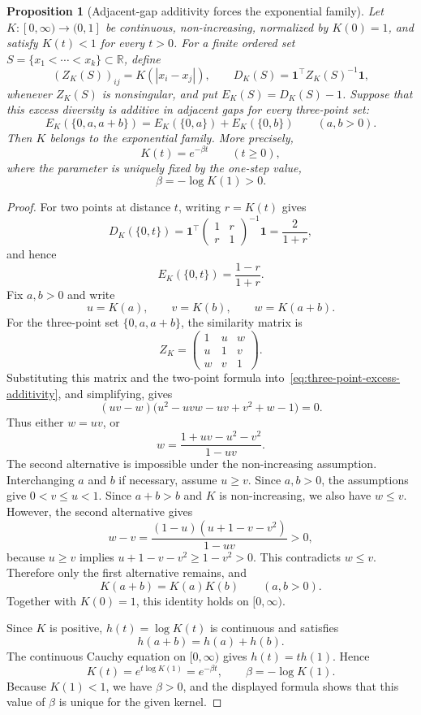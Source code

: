 \documentclass[10pt,a4paper]{amsart}
\newtheorem{proposition}{Proposition}
\begin{document}
\begin{proposition}[Adjacent-gap additivity forces the exponential family]
\label{prop:converse-exponential-kernel}
Let $K:[0,\infty)\to(0,1]$ be continuous, non-increasing, normalized by $K(0)=1$, and satisfy $K(t)<1$ for every $t>0$.  For a finite ordered set $S=\{x_1<\cdots<x_k\}\subset\mathbb{R}$, define
\[
  (Z_K(S))_{ij}=K(|x_i-x_j|),
  \qquad
  D_K(S)=\mathbf{1}^\top Z_K(S)^{-1}\mathbf{1},
\]
whenever $Z_K(S)$ is nonsingular, and put $E_K(S)=D_K(S)-1$.  Suppose that this excess diversity is additive in adjacent gaps for every three-point set:
\begin{equation}
\label{eq:three-point-excess-additivity}
  E_K(\{0,a,a+b\})
  =E_K(\{0,a\})+E_K(\{0,b\})
  \qquad (a,b>0).
\end{equation}
Then $K$ belongs to the exponential family.  More precisely,
\[
  K(t)=e^{-\beta t}\qquad(t\geq0),
\]
where the parameter is uniquely fixed by the one-step value,
\[
  \beta=-\log K(1)>0.
\]
\end{proposition}

\begin{proof}
For two points at distance $t$, writing $r=K(t)$ gives
\[
  D_K(\{0,t\})
  =\mathbf{1}^\top
  \begin{pmatrix}1&r\\ r&1\end{pmatrix}^{-1}
  \mathbf{1}
  =\frac{2}{1+r},
\]
and hence
\[
  E_K(\{0,t\})=\frac{1-r}{1+r}.
\]
Fix $a,b>0$ and write
\[
  u=K(a),\qquad v=K(b),\qquad w=K(a+b).
\]
For the three-point set $\{0,a,a+b\}$, the similarity matrix is
\[
  Z_K=
  \begin{pmatrix}
  1 & u & w\\
  u & 1 & v\\
  w & v & 1
  \end{pmatrix}.
\]
Substituting this matrix and the two-point formula into~\eqref{eq:three-point-excess-additivity}, and simplifying, gives
\[
  (uv-w)\bigl(u^2-uvw-uv+v^2+w-1\bigr)=0.
\]
Thus either $w=uv$, or
\[
  w=\frac{1+uv-u^2-v^2}{1-uv}.
\]
The second alternative is impossible under the non-increasing assumption.  Interchanging $a$ and $b$ if necessary, assume $u\geq v$.  Since $a,b>0$, the assumptions give $0<v\leq u<1$.  Since $a+b>b$ and $K$ is non-increasing, we also have $w\leq v$.  However, the second alternative gives
\[
  w-v
  =\frac{(1-u)(u+1-v-v^2)}{1-uv}>0,
\]
because $u\geq v$ implies $u+1-v-v^2\geq1-v^2>0$.  This contradicts $w\leq v$.  Therefore only the first alternative remains, and
\[
  K(a+b)=K(a)K(b)
  \qquad(a,b>0).
\]
Together with $K(0)=1$, this identity holds on $[0,\infty)$.

Since $K$ is positive, $h(t)=\log K(t)$ is continuous and satisfies
\[
  h(a+b)=h(a)+h(b).
\]
The continuous Cauchy equation on $[0,\infty)$ gives $h(t)=t h(1)$.  Hence
\[
  K(t)=e^{t\log K(1)}=e^{-\beta t},
  \qquad
  \beta=-\log K(1).
\]
Because $K(1)<1$, we have $\beta>0$, and the displayed formula shows that this value of $\beta$ is unique for the given kernel.
\end{proof}
\end{document}
